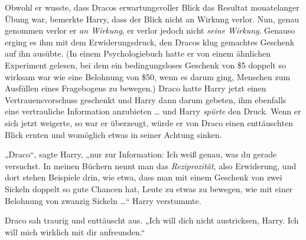Obwohl er wusste, dass Dracos erwartungsvoller Blick das Resultat monatelanger Übung war, bemerkte Harry, dass der Blick nicht an Wirkung verlor. Nun, genau genommen verlor er \emph{an Wirkung}, er verlor jedoch nicht \emph{seine Wirkung}. Genauso erging es ihm mit dem Erwiderungsdruck, den Dracos klug gemachtes Geschenk auf ihn ausübte. (In einem Psychologiebuch hatte er von einem ähnlichen Experiment gelesen, bei dem ein bedingungsloses Geschenk von \$5 doppelt so wirksam war wie eine Belohnung von \$50, wenn es darum ging, Menschen zum Ausfüllen eines Fragebogens zu bewegen.) Draco hatte Harry jetzt einen Vertrauensvorschuss geschenkt und Harry dann darum gebeten, ihm ebenfalls eine vertrauliche Information anzubieten … und Harry \emph{spürte} den Druck. Wenn er sich jetzt weigerte, so war er überzeugt, würde er von Draco einen enttäuschten Blick ernten und womöglich etwas in seiner Achtung sinken.

„Draco“, sagte Harry, „nur zur Information: Ich weiß genau, was du gerade versuchst. In meinen Büchern nennt man das \emph{Reziprozität}, also Erwiderung, und dort stehen Beispiele drin, wie etwa, dass man mit einem Geschenk von zwei Sickeln doppelt so gute Chancen hat, Leute zu etwas zu bewegen, wie mit einer Belohnung von zwanzig Sickeln …“ Harry verstummte.

Draco sah traurig und enttäuscht aus.
„Ich will dich nicht austricksen, Harry. Ich will mich wirklich mit dir anfreunden.“


